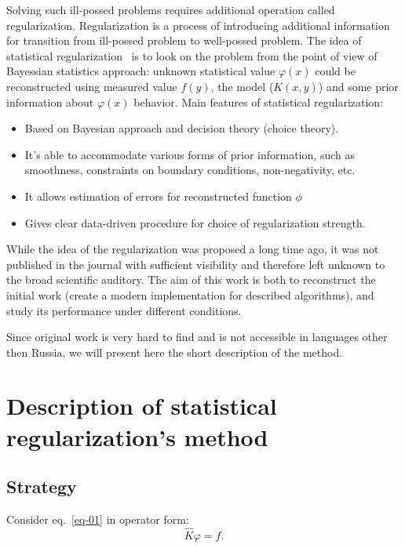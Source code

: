 \documentclass{webofc}
\begin{document}
Solving such ill-possed problems requires additional operation called regularization. Regularization is a process of introducing additional information for transition from ill-possed problem to well-possed problem. The idea of statistical regularization~\cite{Turchin, Turovceva} is to look on the problem from the point of view of Bayessian statistics approach: unknown statistical value $\varphi(x)$ could be reconstructed using  measured value $f(y)$, the model ($K(x,y)$) and some prior information about $\varphi(x)$ behavior. Main features of statistical regularization:
\begin{itemize}
    \item Based on Bayesian approach and decision theory (choice theory).
    \item It's able to accommodate various forms of prior information, such as
      smoothness, constraints on boundary conditions, non-negativity, etc.
    \item It allows estimation of errors for reconstructed function $\phi$
    \item Gives clear data-driven procedure for choice of regularization
      strength.
\end{itemize}

While the idea of the regularization was proposed a long time ago, it was not published in the journal with sufficient visibility and therefore left unknown to the broad scientific auditory. The aim of this work is both to reconstruct the initial work (create a modern implementation for described algorithms), and study its performance under different conditions.

Since original work is very hard to find and is not accessible in languages other then Russia, we will present here the short description of the method.

\section{Description of statistical regularization's method}

\subsection{Strategy}\label{sec:theory:strat}

Consider eq.~\ref{eq-01} in operator form:
\begin{equation}
	\label{eq-02}
    \hat{K}\varphi = f.
\end{equation}
\end{document}
